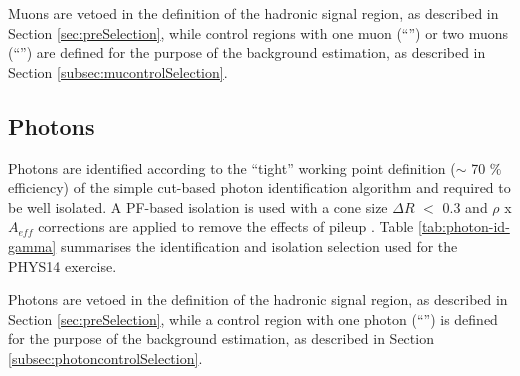
Muons are vetoed in the definition of the hadronic signal region, 
as described in Section \ref{sec:preSelection}, while 
control regions with one muon (``\mj'') or two muons (``\mmj'') are defined for the purpose of the background estimation, 
as described in Section \ref{subsec:mucontrolSelection}.




\subsection{Photons}
\label{sec:photon-id}
Photons are identified according to the ``tight'' working point definition ($\sim$ 70 $\%$ efficiency) 
of the simple cut-based photon identification algorithm \cite{photon-id} 
and required to be well isolated. 
A PF-based isolation is used with a cone size $\Delta R$ $<$ 0.3 and $\rho$ x $A_{eff}$ corrections are applied to remove the effects of pileup \cite{pf-photon}. 
Table \ref{tab:photon-id-gamma} summarises the identification and isolation selection used for the PHYS14 exercise. 

Photons are vetoed in the definition of the hadronic signal region, 
as described in Section \ref{sec:preSelection}, while a 
control region with one photon (``\gj'') is defined for the purpose of the background estimation, 
as described in Section \ref{subsec:photoncontrolSelection}.


